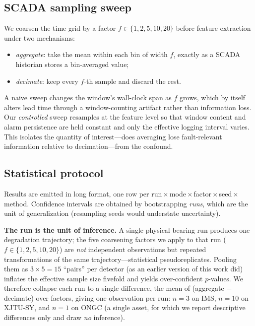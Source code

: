 \documentclass[journal]{IEEEtran}
\begin{document}
\subsection{SCADA sampling sweep}
We coarsen the time grid by a factor $f \in \{1,2,5,10,20\}$ before feature
extraction under two mechanisms:
\begin{itemize}
\item \emph{aggregate}: take the mean within each bin of width $f$, exactly as a
SCADA historian stores a bin-averaged value;
\item \emph{decimate}: keep every $f$-th sample and discard the rest.
\end{itemize}
A naive sweep changes the window's wall-clock span as $f$ grows, which by itself
alters lead time through a window-counting artifact rather than information
loss. Our \emph{controlled} sweep resamples at the feature level so that window
content and alarm persistence are held constant and only the effective logging
interval varies. This isolates the quantity of interest---does averaging lose
fault-relevant information relative to decimation---from the confound.

\subsection{Statistical protocol}
\label{sec:statprotocol}
Results are emitted in long format, one row per
run\,$\times$\,mode\,$\times$\,factor\,$\times$\,seed\,$\times$\,method.
Confidence intervals are obtained by bootstrapping \emph{runs}, which are the
unit of generalization (resampling seeds would understate uncertainty).

\textbf{The run is the unit of inference.} A single physical bearing run
produces one degradation trajectory; the five coarsening factors we apply to
that run ($f\in\{1,2,5,10,20\}$) are \emph{not} independent observations but
repeated transformations of the same trajectory---statistical
pseudoreplicates. Pooling them as $3\times5=15$ ``pairs'' per detector (as an
earlier version of this work did) inflates the effective sample size fivefold
and yields over-confident $p$-values. We therefore collapse each run to a
single difference, the mean of (aggregate $-$ decimate) over factors, giving
one observation per run: $n{=}3$ on IMS, $n{=}10$ on XJTU-SY, and $n{=}1$ on
ONGC (a single asset, for which we report descriptive differences only and draw
\emph{no} inference).
\end{document}
